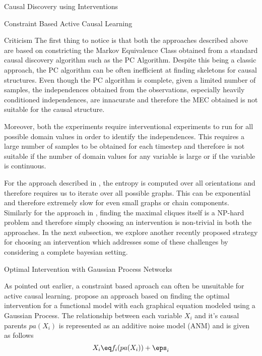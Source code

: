 \documentclass[10pt]{article}
\begin{document}
\begin{psection}[4]{Causal Discovery using Interventions}
\begin{psubsection}{Constraint Based Active Causal Learning}
\begin{pssubsection}{Criticism}
            The first thing to notice is that both the approaches described above are
            based on constricting the Markov Equivalence Class obtained from a standard
            causal discovery algorithm such as the PC Algorithm. Despite this being a
            classic approach, the PC algorithm can be often inefficient at finding
            skeletons for causal structures. Even though the PC algorithm is complete,
            given a limited number of samples, the independences obtained from the
            observations, especially heavily conditioned independences, are innacurate
            and therefore the MEC obtained is not suitable for the causal structure.

            Moreover, both the experiments require interventional experiments to run for
            all possible domain values in order to identify the independences. This
            requires a large number of samples to be obtained for each timestep and
            therefore is not suitable if the number of domain values for any variable is
            large or if the variable is continuous.

            For the approach described in \citep{he2008active}, the entropy is computed
            over all orientations and therefore requires us to iterate over all possible
            graphs. This can be exponential and therefore extremely slow for even small
            graphs or chain components. Similarly for the approach in
            \citep{eberhardt2012}, finding the maximal cliques itself is a NP-hard
            problem and therefore simply choosing an intervention is non-trivial in both
            the approaches. In the next subsection, we explore another recently proposed
            strategy for choosing an intervention which addresses some of these
            challenges by considering a complete bayesian setting.
        
        \end{pssubsection}
    
    \end{psubsection}

    \begin{psubsection}{Optimal Intervention with Gaussian Process Networks}
    
        As pointed out earlier, a constraint based aproach can often be unsuitable for
        active causal learning. \citet{kgelgen2019optimal} propose an approach based on
        finding the optimal intervention for a functional model with each graphical
        equation modeled using a Gaussian Process. The relationship between each
        variable $X_i$ and it's causal parents $pa(X_i)$ is represented as an additive
        noise model (ANM) and is given as follows
        \begin{equation}
            X_i \eq f_i(pa(X_i)) + \eps_i
        \end{equation}


\end{psubsection}
\end{psection}
\end{document}
